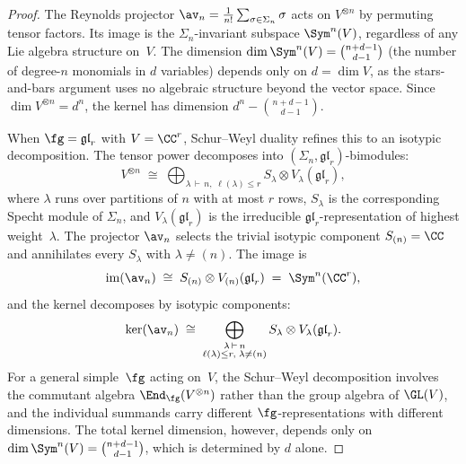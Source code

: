 \begin{proof}
The Reynolds projector
$\av_n = \frac{1}{n!}\sum_{\sigma \in \Sigma_n} \sigma$
acts on $V^{\otimes n}$ by permuting tensor factors.
Its image is the $\Sigma_n$-invariant subspace
$\Sym^n(V)$, regardless of any Lie algebra structure
on~$V$. The dimension
$\dim\Sym^n(V) = \binom{n+d-1}{d-1}$ (the number of
degree-$n$ monomials in $d$ variables) depends only on
$d = \dim V$, as the stars-and-bars argument uses no
algebraic structure beyond the vector space.
Since $\dim V^{\otimes n} = d^n$, the kernel has dimension
$d^n - \binom{n+d-1}{d-1}$.

When $\fg = \mathfrak{gl}_r$ with $V = \CC^r$,
Schur--Weyl duality refines this to an isotypic
decomposition. The tensor power decomposes into
$(\Sigma_n, \mathfrak{gl}_r)$-bimodules:
\begin{equation}\label{eq:schur-weyl-decomp}
  V^{\otimes n}
  \;\cong\;
  \bigoplus_{\lambda \,\vdash\, n,\;
    \ell(\lambda) \leq r}
  S_\lambda \otimes V_\lambda(\mathfrak{gl}_r),
\end{equation}
where $\lambda$ runs over partitions of $n$ with at most
$r$ rows, $S_\lambda$ is the corresponding Specht module
of $\Sigma_n$, and $V_\lambda(\mathfrak{gl}_r)$ is the
irreducible $\mathfrak{gl}_r$-representation of highest
weight~$\lambda$.
The projector $\av_n$ selects the trivial isotypic
component $S_{(n)} = \CC$ and annihilates every
$S_\lambda$ with $\lambda \neq (n)$. The image is
\[
  \operatorname{im}(\av_n)
  \;\cong\;
  S_{(n)} \otimes V_{(n)}(\mathfrak{gl}_r)
  \;=\;
  \Sym^n(\CC^r),
\]
and the kernel decomposes by isotypic components:
\[
  \ker(\av_n)
  \;\cong\;
  \bigoplus_{\substack{\lambda \,\vdash\, n \\
    \ell(\lambda) \leq r,\;
    \lambda \neq (n)}}
  S_\lambda \otimes V_\lambda(\mathfrak{gl}_r).
\]
For a general simple~$\fg$ acting on~$V$, the Schur--Weyl
decomposition involves the commutant algebra
$\End_\fg(V^{\otimes n})$ rather than the group algebra of
$\GL(V)$, and the individual summands carry different
$\fg$-representations with different dimensions.
The total kernel dimension, however, depends only on
$\dim\Sym^n(V) = \binom{n+d-1}{d-1}$, which is
determined by $d$ alone.
\end{proof}

